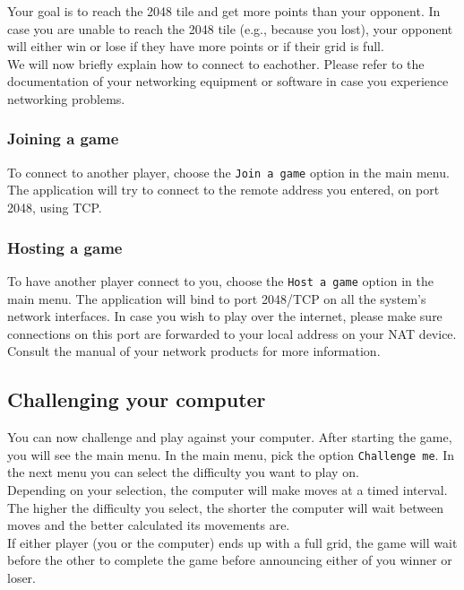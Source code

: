 \documentclass[a4paper,11pt,report]{scrartcl}
\begin{document}
Your goal is to reach the 2048 tile and get more points than your opponent.  In case you
are unable to reach the 2048 tile (e.g., because you lost), your opponent will either win or lose if they have more points or if their grid is full.\\

We will now briefly explain how to connect to eachother. Please refer to the
documentation of your networking equipment or software in case you experience
networking problems.

\subsubsection{Joining a game}
To connect to another player, choose the \texttt{Join a game} option in the
main menu. The application will try to connect to the remote address you
entered, on port 2048, using TCP.

\subsubsection{Hosting a game}
To have another player connect to you, choose the \texttt{Host a game} option
in the main menu. The application will bind to port 2048/TCP on all the
system's network interfaces. In case you wish to play over the internet,
please make sure connections on this port are forwarded to your local address
on your NAT device. Consult the manual of your network products for more 
information.


\subsection{Challenging your computer}

You can now challenge and play against your computer. After starting the game, you will see the main menu. In the main menu, pick the option \texttt{Challenge me}. In the next menu you can select the difficulty you want to play on.\\

Depending on your selection, the computer will make moves at a timed interval. The higher the difficulty you select, the shorter the computer will wait between moves and the better calculated its movements are.\\

If either player (you or the computer) ends up with a full grid, the game will wait before the other to complete the game before announcing either of you winner or loser.\\
\end{document}
